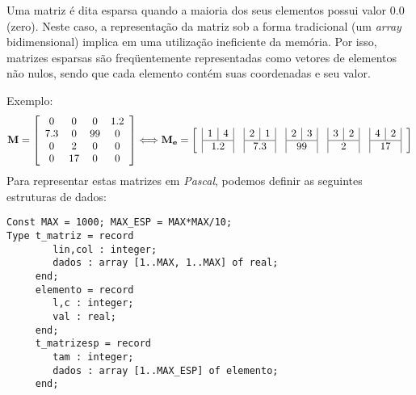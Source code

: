\item Uma matriz é dita esparsa quando a maioria dos seus elementos possui valor $0.0$
(zero). Neste caso, a representação da matriz sob a forma tradicional (um
\emph{array} bidimensional) implica em uma utilização ineficiente da memória.
Por isso, matrizes esparsas são freqüentemente representadas como vetores de
elementos não nulos, sendo que cada elemento contém suas coordenadas e seu
valor.

Exemplo:
\begin{displaymath}
    \mathbf{M} = \left[ \begin{array}{cccc}
                         0 & 0 & 0 & 1.2 \\
                         7.3 & 0 & 99 & 0 \\
                         0 & 2 & 0 & 0 \\
                         0 & 17 & 0 & 0
                        \end{array} \right] \Longleftrightarrow   
    \mathbf{M_e} = \left[ \begin{array}{ccccc}
                         \begin{array}{|c|c|}
                                1 & 4 \\ \hline \multicolumn{2}{|c|}{1.2}
                               \end{array} &
                         \begin{array}{|c|c|}
                                2 & 1 \\ \hline \multicolumn{2}{|c|}{7.3}
                               \end{array} &
                         \begin{array}{|c|c|}
                                2 & 3 \\ \hline \multicolumn{2}{|c|}{99}
                               \end{array} &
                         \begin{array}{|c|c|}
                                3 & 2 \\ \hline \multicolumn{2}{|c|}{2}
                               \end{array} &
                         \begin{array}{|c|c|}
                                4 & 2 \\ \hline \multicolumn{2}{|c|}{17}
                               \end{array}
                    \end{array} \right]
\end{displaymath}
Para representar estas matrizes em \emph{Pascal}, podemos definir as
seguintes estruturas de dados:
\begin{lstlisting}
Const MAX = 1000; MAX_ESP = MAX*MAX/10;
Type t_matriz = record
        lin,col : integer;
        dados : array [1..MAX, 1..MAX] of real;
     end;
     elemento = record
        l,c : integer;
        val : real;
     end;
     t_matrizesp = record
        tam : integer;
        dados : array [1..MAX_ESP] of elemento;
     end;
\end{lstlisting}

